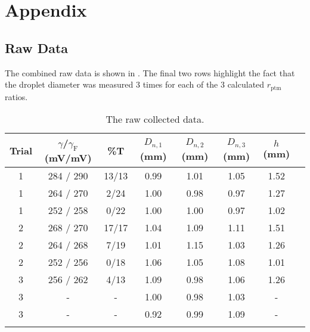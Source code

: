 

\chapter*{Appendix}
\setcounter{chapter}{5}
	\setcounter{section}{0}
	\setcounter{table}{0}
\label{app:raw}
\section*{Raw Data}
The combined raw data is shown in . The final two rows highlight the fact that the droplet diameter was measured 3 times for each of the 3 calculated $r_\mathrm{ptm}$ ratios.
\renewcommand{\thetable}{\Alph{table}}
\begin{table}[ht]
\caption{The raw collected data.}
\centering
\begin{tabular}{cccccccc}
  \hline
 Trial & $\gamma$/$\gamma_\mathrm{F}$ (mV/mV) & \%T & $D_{n,1}$ (mm) &$D_{n,2}$ (mm) & $D_{n,3}$ (mm)& $h$ (mm) \\ 
  \hline
 1  & 284 / 290 & 13/13 & 0.99 &1.01&1.05& 1.52  \\ 
   1  & 264 / 270 & 2/24 & 1.00 &0.98 &0.97 & 1.27   \\ 
   1  & 252 / 258 & 0/22 & 1.00 & 1.00 &0.97 & 1.02  \\ 
   2  & 268 / 270 & 17/17 & 1.04 &1.09 &1.11 & 1.51 \\ 
   2  & 264 / 268 & 7/19 & 1.01 &1.15 &1.03 & 1.26   \\ 
   2  & 252 / 256 & 0/18 & 1.06 &1.05 &1.08 & 1.01   \\ 
   3  & 256 / 262 & 4/13 & 1.09& 0.98& 1.06 & 1.26   \\
   3&-&-& 1.00 & 0.98 & 1.03 & -\\
   3&-&-& 0.92& 0.99& 1.09 & -
   \\ 
   \hline
  \label{raw}
\end{tabular}
\end{table}


